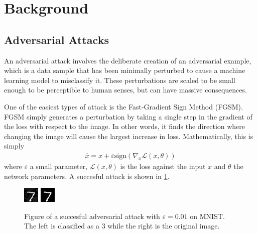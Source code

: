 \documentclass{article}
\begin{document}
    \section{Background}

    \subsection{Adversarial Attacks}
    An adversarial attack involves the deliberate creation of an adversarial example, which is a data sample that has been minimally perturbed to cause a machine learning model to misclassify it.
    These perturbations are scaled to be small enough to be perceptible to human senses, but can have massive consequences.

    One of the easiest types of attack is the Fast-Gradient Sign Method (FGSM).
    FGSM simply generates a perturbation by taking a single step in the gradient of the loss with respect to the image.
    In other words, it finds the direction where changing the image will cause the largest increase in loss.
    Mathematically, this is simply
    \begin{align}
        \label{eqn:fgsm}
        \bar x = x + \varepsilon \text{sign}(\nabla_x \mathcal L(x, \theta))
    \end{align}
    where $\varepsilon$ a small parameter, $\mathcal L(x, \theta)$ is the loss against the input $x$ and $\theta$ the network parameters.
    A succesful attack is shown in \cref{fig:attack}.

    \begin{figure}
        \centering
        \includegraphics{../src/multirun/2025-08-30/22-19-32/0/fgsm_examples/adversarial_200_0_label_3.png}
        \includegraphics{../src/multirun/2025-08-30/22-19-32/0/fgsm_examples/original_200_0_label_7.png}
        \caption{Figure of a succesful adversarial attack with $\varepsilon=0.01$ on MNIST.
        The left is classified as a 3 while the right is the original image.}
        \label{fig:attack}
    \end{figure}
\end{document}

